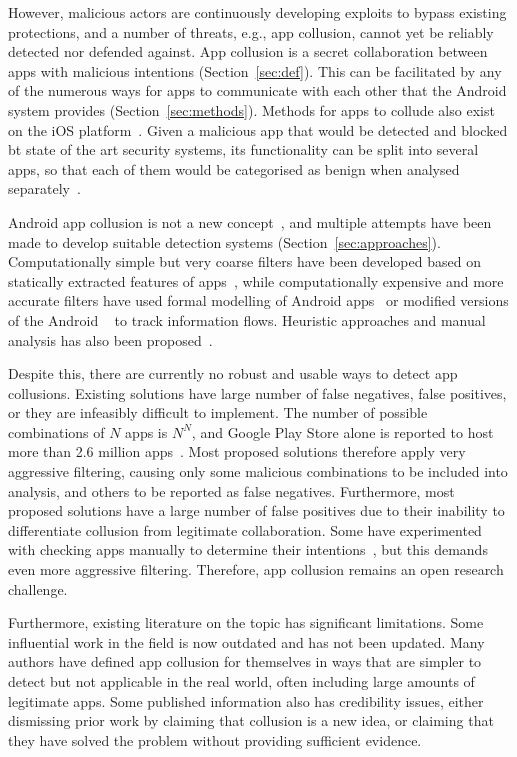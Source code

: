 \documentclass[article, oneside]{aaltoseries}
\newcommand{\Sref}[1]{Section~\ref{#1}}
\renewcommand\gls\cgls \renewcommand\glspl\cglspl %
\providecommand{\DIFaddend}{} %
\begin{document}
\DIFaddend However, malicious actors are continuously developing
exploits to bypass existing protections, and a number of
threats, e.g., app collusion, cannot yet be reliably
detected nor defended against. App collusion is a secret
collaboration between apps with malicious intentions
(\Sref{sec:def}). This can be facilitated by any of the
numerous ways for apps to communicate with each other that
the Android system provides (\Sref{sec:methods}). Methods
for apps to collude also exist on the iOS
platform~\cite{Deshotels2016}. Given a malicious app that
would be detected and blocked bt state of the art security
systems, its functionality can be split into several apps,
so that each of them would be categorised as benign when
analysed separately~\cite{Chen2018}.

Android app collusion is not a new
concept~\cite{Schlegel2011}, and multiple attempts have been
made to develop suitable detection systems
(\Sref{sec:approaches}). Computationally simple but very
coarse filters have been developed based on statically
extracted features of apps~\cite{Asavoae2016, Chen2018},
while computationally expensive and more accurate filters
have used formal modelling of Android
apps~\cite{Asavoae2018} or modified versions of the Android
\gls{os}~\cite{Enck2014} to track information flows.
Heuristic approaches and manual analysis has also been
proposed~\cite{Muttik2016}.

Despite this, there are currently no robust and usable ways
to detect app collusions. Existing solutions have large
number of false negatives, false positives, or they are
infeasibly difficult to implement. The number of possible
combinations of $N$ apps is $N^N$, and Google Play Store
alone is reported to host more than 2.6 million
apps~\cite{Statista2018}. Most proposed solutions therefore
apply very aggressive filtering, causing only some malicious
combinations to be included into analysis, and others to be
reported as false negatives. Furthermore, most proposed
solutions have a large number of false positives due to
their inability to differentiate collusion from legitimate
collaboration. Some have experimented with checking apps
manually to determine their intentions~\cite{Muttik2016},
but this demands even more aggressive filtering. Therefore,
app collusion remains an open research challenge.

Furthermore, existing literature on the topic has
significant limitations. Some influential work in the field
is now outdated and has not been updated. Many authors have
defined app collusion for themselves in ways that are
simpler to detect but not applicable in the real world,
often including large amounts of legitimate apps. Some
published information also has
credibility issues, either dismissing prior work by claiming
that collusion is a new idea, or claiming that they have
solved the problem without providing sufficient evidence.
\end{document}
